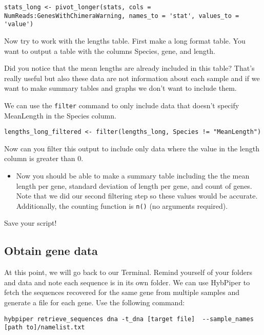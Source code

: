 \documentclass[
]{book}
\providecommand{\tightlist}{%
  \setlength{\itemsep}{0pt}\setlength{\parskip}{0pt}}
\begin{document}
\begin{verbatim}
stats_long <- pivot_longer(stats, cols = NumReads:GenesWithChimeraWarning, names_to = 'stat', values_to = 'value')
\end{verbatim}

Now try to work with the lengths table. First make a long format table. You want to output a table with the columns Species, gene, and length.

Did you notice that the mean lengths are already included in this table? That's really useful but also these data are not information about each sample and if we want to make summary tables and graphs we don't want to include them.

We can use the \texttt{filter} command to only include data that doesn't specify MeanLength in the Species column.

\begin{verbatim}
lengths_long_filtered <- filter(lengths_long, Species != "MeanLength")
\end{verbatim}

Now can you filter this output to include only data where the value in the length column is greater than 0.

\begin{itemize}
\tightlist
\item
  Now you should be able to make a summary table including the the mean length per gene, standard deviation of length per gene, and count of genes. Note that we did our second filtering step so these values would be accurate. Additionally, the counting function is \texttt{n()} (no arguments required).
\end{itemize}

Save your script!

\hypertarget{obtain-gene-data}{%
\subsection{Obtain gene data}\label{obtain-gene-data}}

At this point, we will go back to our Terminal.
Remind yourself of your folders and data and note each sequence is in its own folder.
We can use HybPiper to fetch the sequences recovered for the same gene from multiple samples and generate a file for each gene. Use the following command:

\begin{verbatim}
hybpiper retrieve_sequences dna -t_dna [target file]  --sample_names [path to]/namelist.txt
\end{verbatim}
\end{document}
